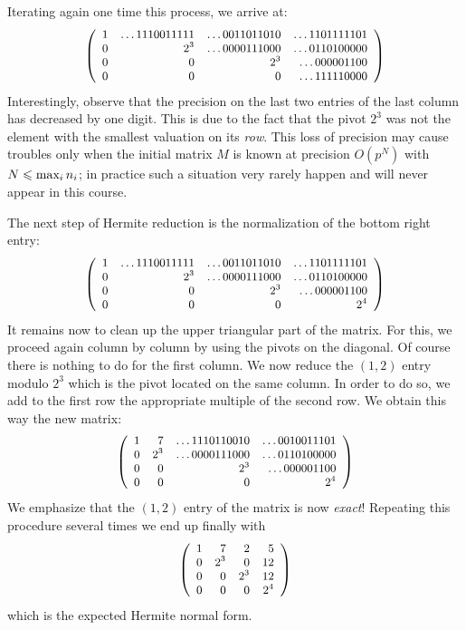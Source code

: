 \documentclass[11pt]{article}
\numberwithin{equation}{section}
\numberwithin{figure}{section}
\renewcommand{\leq}{\leqslant}
\theoremstyle{definition}
\renewcommand{\max}{\text{\rm max}}
\begin{document}
Iterating again one time this process, we arrive at:
$$\small \left(\begin{array}{rrrr}
1 & \ldots1110011111 & \ldots0011011010 & \ldots1101111101 \\
0 & 2^3 & \ldots0000111000 & \ldots0110100000 \\
0 &   0 & 2^3 & \ldots000001100 \\
0 &   0 &   0 & \ldots111110000
\end{array}\right)$$
Interestingly, observe that the precision on the last two entries of the
last column has decreased by one digit. This is due to the fact that the
pivot $2^3$ was not the element with the smallest valuation on its
\emph{row}. This loss of precision may cause troubles only when the 
initial matrix $M$ is known at precision $O(p^N)$ with $N \leq \max_i\, 
n_i$; in practice such a situation very rarely happen and will never
appear in this course. 

The next step of Hermite reduction is the normalization of the bottom
right entry:
$$\small \left(\begin{array}{rrrr}
1 & \ldots1110011111 & \ldots0011011010 & \ldots1101111101 \\
0 & 2^3 & \ldots0000111000 & \ldots0110100000 \\
0 &   0 & 2^3 & \ldots000001100 \\
0 &   0 &   0 & 2^4
\end{array}\right)$$
It remains now to clean up the upper triangular part of the matrix. For this, we
proceed again column by column by using the pivots on the diagonal. Of
course there is nothing to do for the first column. We now reduce the 
$(1,2)$ entry modulo $2^3$ which is the pivot located on the same column.
In order to do so, we add to the first row the appropriate multiple 
of the second row. We obtain this way the new matrix:
$$\small \left(\begin{array}{rrrr}
1 &   7 & \ldots1110110010 & \ldots0010011101 \\
0 & 2^3 & \ldots0000111000 & \ldots0110100000 \\
0 &   0 & 2^3 & \ldots000001100 \\
0 &   0 &   0 & 2^4
\end{array}\right)$$
We emphasize that the $(1,2)$ entry of the matrix is now \emph{exact}!
Repeating this procedure several times we end up finally with
$$\small \left(\begin{array}{rrrr}
1 &   7 &   2 &   5 \\
0 & 2^3 &   0 &  12 \\
0 &   0 & 2^3 &  12 \\
0 &   0 &   0 & 2^4
\end{array}\right)$$
which is the expected Hermite normal form.
\end{document}
